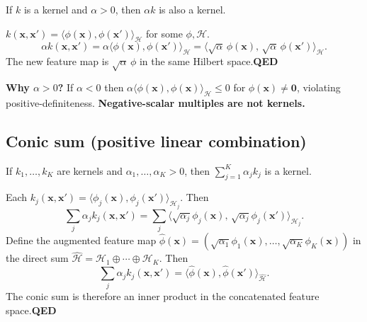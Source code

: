 \documentclass[11pt, a4paper]{article}
\newcommand{\doflag}{\textcolor{defBd}{\textbf{[DO]}}\,}
\begin{document}
\begin{defbox}
If $k$ is a kernel and $\alpha > 0$, then $\alpha k$ is also a kernel.
\end{defbox}

\begin{exbox}[\doflag{}Proof]
$k(\mathbf{x}, \mathbf{x}') = \langle\phi(\mathbf{x}), \phi(\mathbf{x}')\rangle_{\mathcal{H}}$ for some $\phi, \mathcal{H}$.
\[
\alpha k(\mathbf{x}, \mathbf{x}') = \alpha\langle\phi(\mathbf{x}), \phi(\mathbf{x}')\rangle_{\mathcal{H}} = \langle\sqrt{\alpha}\,\phi(\mathbf{x}),\,\sqrt{\alpha}\,\phi(\mathbf{x}')\rangle_{\mathcal{H}}.
\]
The new feature map is $\sqrt{\alpha}\,\phi$ in the same Hilbert space.\hfill\textbf{QED}
\end{exbox}

\textbf{Why $\alpha > 0$?} If $\alpha < 0$ then $\alpha\langle\phi(\mathbf{x}), \phi(\mathbf{x})\rangle_{\mathcal{H}} \le 0$ for $\phi(\mathbf{x}) \ne \mathbf{0}$, violating positive-definiteness. \textbf{Negative-scalar multiples are not kernels.}

\subsection{Conic sum (positive linear combination)}

\begin{defbox}
If $k_1, \ldots, k_K$ are kernels and $\alpha_1, \ldots, \alpha_K > 0$, then $\sum_{j=1}^K \alpha_j k_j$ is a kernel.
\end{defbox}

\begin{exbox}[\doflag{}Proof]
Each $k_j(\mathbf{x}, \mathbf{x}') = \langle\phi_j(\mathbf{x}), \phi_j(\mathbf{x}')\rangle_{\mathcal{H}_j}$. Then
\[
\sum_j \alpha_j k_j(\mathbf{x}, \mathbf{x}') = \sum_j \langle\sqrt{\alpha_j}\phi_j(\mathbf{x}),\,\sqrt{\alpha_j}\phi_j(\mathbf{x}')\rangle_{\mathcal{H}_j}.
\]
Define the augmented feature map $\hat\phi(\mathbf{x}) = (\sqrt{\alpha_1}\phi_1(\mathbf{x}), \ldots, \sqrt{\alpha_K}\phi_K(\mathbf{x}))$ in the direct sum $\hat{\mathcal{H}} = \mathcal{H}_1 \oplus \cdots \oplus \mathcal{H}_K$. Then
\[
\sum_j \alpha_j k_j(\mathbf{x}, \mathbf{x}') = \langle\hat\phi(\mathbf{x}), \hat\phi(\mathbf{x}')\rangle_{\hat{\mathcal{H}}}.
\]
The conic sum is therefore an inner product in the concatenated feature space.\hfill\textbf{QED}
\end{exbox}
\end{document}
